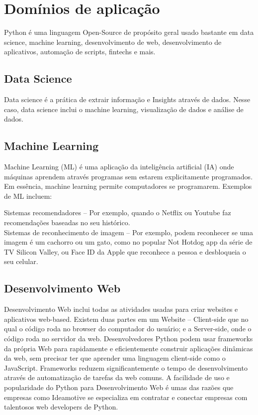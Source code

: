 \documentclass[12pt]{article}
\begin{document}



\section{Domínios de aplicação}

Python é uma linguagem Open-Source de propósito geral usado bastante em data science, machine learning, desenvolvimento de web, desenvolvimento de aplicativos, automação de scripts, fintechs e mais.


\subsection{Data Science}

Data science é a prática de extrair informação e Insights através de dados. Nesse caso, data science inclui o machine learning, visualização de dados e análise de dados.

\subsection{Machine Learning}

Machine Learning (ML) é uma aplicação da inteligência artificial (IA) onde máquinas aprendem através programas sem estarem explicitamente programados. Em essência, machine learning permite computadores se programarem. Exemplos de ML incluem:

Sistemas recomendadores – Por exemplo, quando o Netflix ou Youtube faz recomendações baseadas no seu histórico.\\

Sistemas de reconhecimento de imagem – Por exemplo, podem reconhecer se uma imagem é um cachorro ou um gato, como no popular Not Hotdog app da série de TV Silicon Valley, ou Face ID da Apple que reconhece a pessoa e desbloqueia o seu celular.

\subsection{Desenvolvimento Web}

Desenvolvimento Web inclui todas as atividades usadas para criar websites e aplicativos web-based. Existem duas partes em um Website – Client-side que no qual o código roda no browser do computador do usuário; e a Server-side, onde o código roda no servidor da web. Desenvolvedores Python podem usar frameworks da própria Web para rapidamente e eficientemente construir aplicações dinâmicas da web, sem precisar ter que aprender uma linguagem client-side como o JavaScript. Frameworks reduzem significantemente o tempo de desenvolvimento através de automatização de tarefas da web comuns. A facilidade de uso e popularidade do Python para Desenvolvimento Web é umas das razões que empresas como Ideamotive se especializa em contratar e conectar empresas com talentosos web developers de Python.
\end{document}

